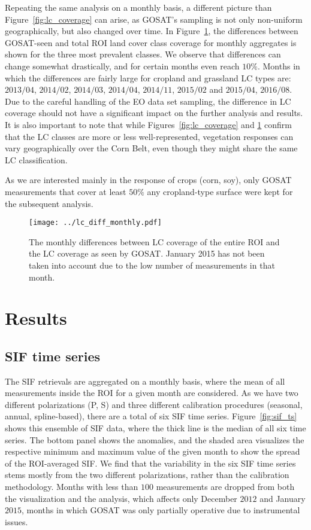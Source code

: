 \documentclass[preprint, a4paper, 10pt, times]{elsarticle}
\begin{document}
Repeating the same analysis on a monthly basis, a different picture than Figure~\ref{fig:lc_coverage} can arise, as GOSAT's sampling is not only non-uniform geographically, but also changed over time. In Figure~\ref{fig:lc_diff_monthly}, the differences between GOSAT-seen and total ROI land cover class coverage for monthly aggregates is shown for the three most prevalent classes. We observe that differences can change somewhat drastically, and for certain months even reach $10\%$. Months in which the differences are fairly large for cropland and grassland LC types are: $2013/04$, $2014/02$, $2014/03$, $2014/04$, $2014/11$, $2015/02$ and $2015/04$, $2016/08$. Due to the careful handling of the EO data set sampling, the difference in LC coverage should not have a significant impact on the further analysis and results. It is also important to note that while Figures~\ref{fig:lc_coverage} and \ref{fig:lc_diff_monthly} confirm that the LC classes are more or less well-represented, vegetation responses can vary geographically over the Corn Belt, even though they might share the same LC classification.

As we are interested mainly in the response of crops (corn, soy), only GOSAT measurements that cover at least $50\%$ any cropland-type surface were kept for the subsequent analysis.

 
\begin{figure}[htbp]
\centering
\texttt{[image: ../lc\_diff\_monthly.pdf]}
\caption{The monthly differences between LC coverage of the entire ROI and the LC coverage as seen by GOSAT. January 2015 has not been taken into account due to the low number of measurements in that month.}
\label{fig:lc_diff_monthly}
\end{figure}

 
\section{Results}

\subsection{SIF time series}
\label{sec:SIF_TS}

The SIF retrievals are aggregated on a monthly basis, where the mean of all measurements inside the ROI for a given month are considered. As we have two different polarizations (P, S) and three different calibration procedures (seasonal, annual, spline-based), there are a total of six SIF time series. Figure~\ref{fig:sif_ts} shows this ensemble of SIF data, where the thick line is the median of all six time series. The bottom panel shows the anomalies, and the shaded area visualizes the respective minimum and maximum value of the given month to show the spread of the ROI-averaged SIF. We find that the variability in the six SIF time series stems mostly from the two different polarizations, rather than the calibration methodology. Months with less than $100$ measurements are dropped from both the visualization and the analysis, which affects only December $2012$ and January $2015$, months in which GOSAT was only partially operative due to instrumental issues.
\end{document}
